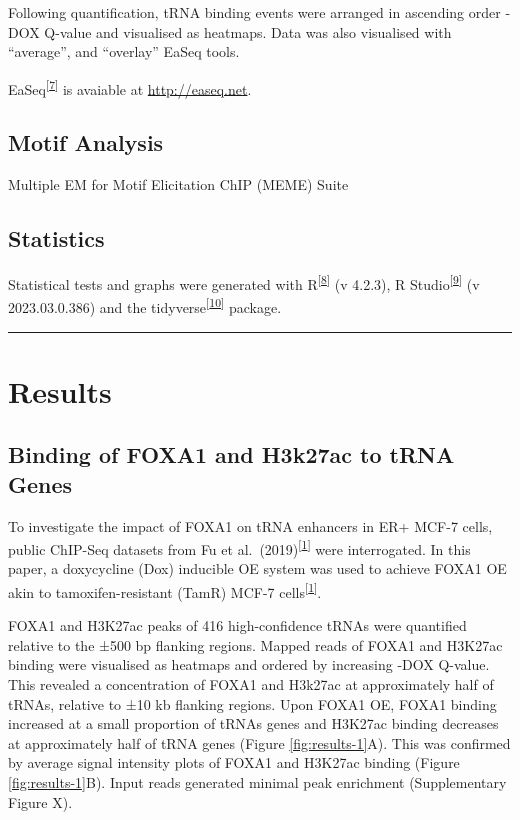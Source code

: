 \documentclass[
  12pt,
]{article}
\begin{document}
Following quantification, tRNA binding events were arranged in ascending order -DOX Q-value and visualised as heatmaps.
Data was also visualised with ``average'', and ``overlay'' EaSeq tools.

EaSeq\textsuperscript{{[}\protect\hyperlink{ref-lerdrup2016}{7}{]}} is avaiable at \url{http://easeq.net}.

\hypertarget{motif-analysis}{%
\subsection{Motif Analysis}\label{motif-analysis}}

Multiple EM for Motif Elicitation ChIP (MEME) Suite

\hypertarget{statistics}{%
\subsection{Statistics}\label{statistics}}

Statistical tests and graphs were generated with R\textsuperscript{{[}\protect\hyperlink{ref-r}{8}{]}} (v 4.2.3), R Studio\textsuperscript{{[}\protect\hyperlink{ref-rstudio}{9}{]}} (v 2023.03.0.386) and the tidyverse\textsuperscript{{[}\protect\hyperlink{ref-wickham2019}{10}{]}} package.

\begin{center}\rule{0.5\linewidth}{0.5pt}\end{center}

\hypertarget{results}{%
\section{Results}\label{results}}

\hypertarget{binding-of-foxa1-and-h3k27ac-to-trna-genes}{%
\subsection{Binding of FOXA1 and H3k27ac to tRNA Genes}\label{binding-of-foxa1-and-h3k27ac-to-trna-genes}}

To investigate the impact of FOXA1 on tRNA enhancers in ER+ MCF-7 cells, public ChIP-Seq datasets from Fu et al.~(2019)\textsuperscript{{[}\protect\hyperlink{ref-fu2019}{1}{]}} were interrogated.
In this paper, a doxycycline (Dox) inducible OE system was used to achieve FOXA1 OE akin to tamoxifen-resistant (TamR) MCF-7 cells\textsuperscript{{[}\protect\hyperlink{ref-fu2019}{1}{]}}.

FOXA1 and H3K27ac peaks of 416 high-confidence tRNAs were quantified relative to the ±500 bp flanking regions.
Mapped reads of FOXA1 and H3K27ac binding were visualised as heatmaps and ordered by increasing -DOX Q-value.
This revealed a concentration of FOXA1 and H3k27ac at approximately half of tRNAs, relative to ±10 kb flanking regions.
Upon FOXA1 OE, FOXA1 binding increased at a small proportion of tRNAs genes and H3K27ac binding decreases at approximately half of tRNA genes (Figure \ref{fig:results-1}A).
This was confirmed by average signal intensity plots of FOXA1 and H3K27ac binding (Figure \ref{fig:results-1}B).
Input reads generated minimal peak enrichment (Supplementary Figure X).
\end{document}
